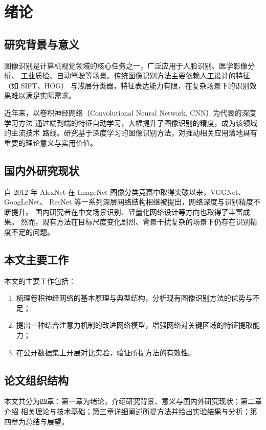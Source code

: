 \section{绪\quad 论}

\subsection{研究背景与意义}

\quad 图像识别是计算机视觉领域的核心任务之一，广泛应用于人脸识别、医学影像分析、
工业质检、自动驾驶等场景。传统图像识别方法主要依赖人工设计的特征（如 SIFT、HOG）
与浅层分类器，特征表达能力有限，在复杂场景下的识别效果难以满足实际需求。

近年来，以卷积神经网络（Convolutional Neural Network, CNN）为代表的深度学习方法
通过端到端的特征自动学习，大幅提升了图像识别的精度，成为该领域的主流技术
路线\cite{ref-lecun2015}。研究基于深度学习的图像识别方法，对推动相关应用落地具有
重要的理论意义与实用价值。

\subsection{国内外研究现状}

\quad 自 2012 年 AlexNet 在 ImageNet 图像分类竞赛中取得突破以来，VGGNet、GoogLeNet、
ResNet\cite{ref-he2016} 等一系列深层网络结构相继被提出，网络深度与识别精度不断提升。
国内研究者在中文场景识别、轻量化网络设计等方向也取得了丰富成果\cite{ref-wang2020}。
然而，现有方法在目标尺度变化剧烈、背景干扰复杂的场景下仍存在识别精度不足的问题。

\subsection{本文主要工作}

\quad 本文的主要工作包括：
\begin{enumerate}
  \item 梳理卷积神经网络的基本原理与典型结构，分析现有图像识别方法的优势与不足；
  \item 提出一种结合注意力机制的改进网络模型，增强网络对关键区域的特征提取能力；
  \item 在公开数据集上开展对比实验，验证所提方法的有效性。
\end{enumerate}

\subsection{论文组织结构}

\quad 本文共分为四章：第一章为绪论，介绍研究背景、意义与国内外研究现状；第二章介绍
相关理论与技术基础；第三章详细阐述所提方法并给出实验结果与分析；第四章为总结与展望。
